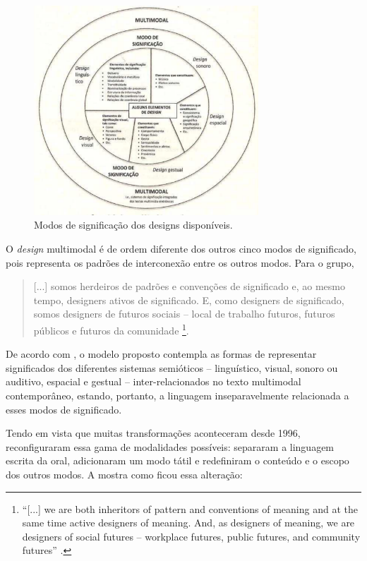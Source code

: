 \documentclass{textolivre}
\begin{document}
\begin{figure}[htbp]
 \centering
 \includegraphics[width=0.75\textwidth]{figure02.pdf}
 \caption{Modos de significação dos designs disponíveis.}
 \label{fig02}
\end{figure}

O \emph{design} multimodal é de ordem diferente dos outros cinco modos de
significado, pois representa os padrões de interconexão entre os outros modos.
Para o grupo,
\begin{quote}
[...] somos herdeiros de padrões e convenções de significado e, ao mesmo tempo,
designers ativos de significado. E, como designers de significado, somos
designers de futuros sociais – local de trabalho futuros, futuros públicos e
futuros da comunidade \cite[p. 65, tradução nossa]{cazden1996}\footnote{
“[...] we are both inheritors of pattern and conventions of meaning and at the
same time active designers of meaning. And, as designers of meaning, we are
designers of social futures – workplace futures, public futures, and community
futures” \cite[p. 65]{cazden1996}.
}. 
\end{quote}

De acordo com \textcite{cope2009}, o modelo proposto contempla as formas de
representar significados dos diferentes sistemas semióticos – linguístico,
visual, sonoro ou auditivo, espacial e gestual – inter-relacionados no texto
multimodal contemporâneo, estando, portanto, a linguagem inseparavelmente
relacionada a esses modos de significado.

Tendo em vista que muitas transformações aconteceram desde 1996, \textcite{cope2009}
reconfiguraram essa gama de modalidades possíveis: separaram a
linguagem escrita da oral, adicionaram um modo tátil e redefiniram o conteúdo e
o escopo dos outros modos. A  mostra como ficou essa alteração:
\end{document}
